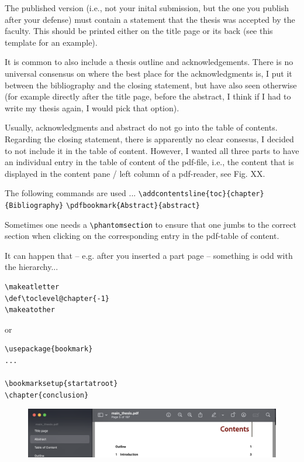 The published version (i.e., not your inital submission, but the one you publish after your defense) must contain a statement that the thesis was accepted by the faculty. This should be printed either on the title page or its back (see this template for an example).

It is common to also include a thesis outline and acknowledgements. There is no universal consensus on where the best place for the acknowledgments is, I put it between the bibliography and the closing statement, but have also seen otherwise (for example directly after the title page, before the abstract, I think if I had to write my thesis again, I would pick that option).

Usually, acknowledgments and abstract do not go into the table of contents. Regarding the closing statement, there is apparently no clear consesus, I decided to not include it in the table of content. However, I wanted all three parts to have an individual entry in the table of content of the pdf-file, i.e., the content that is displayed in the content pane / left column of a pdf-reader, see Fig. XX.

The following commands are used ...
\verb|\addcontentsline{toc}{chapter}{Bibliography}|
\verb|\pdfbookmark{Abstract}{abstract}|


Sometimes one needs a \verb|\phantomsection| to ensure that one jumbs to the correct section when clicking on the corresponding entry in the pdf-table of content.

It can happen that -- e.g. after you inserted a part page -- something is odd with the hierarchy...

\begin{lstlisting}
\makeatletter
\def\toclevel@chapter{-1}
\makeatother
\end{lstlisting}
or 
\begin{lstlisting}
\usepackage{bookmark}
...

\bookmarksetup{startatroot}
\chapter{conclusion}
\end{lstlisting}


\begin{figure}
	\includegraphics[width = \textwidth]{pdf-toc.png}
\end{figure}

